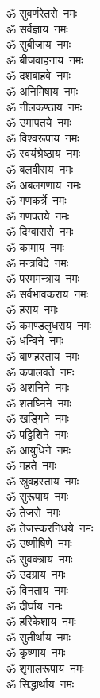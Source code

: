 \begin{multicols}{2}
\begin{flushleft}
ॐ सुवर्णरेतसे~नमः\\
ॐ सर्वज्ञाय~नमः\\
ॐ सुबीजाय~नमः\\
ॐ बीजवाहनाय~नमः\hfill{}\\
ॐ दशबाहवे~नमः\\
ॐ अनिमिषाय~नमः\\
ॐ नीलकण्ठाय~नमः\\
ॐ उमापतये~नमः\\
ॐ विश्वरूपाय~नमः\\
ॐ स्वयंश्रेष्ठाय~नमः\\
ॐ बलवीराय~नमः\\
ॐ अबलगणाय~नमः\\
ॐ गणकर्त्रे~नमः\\
ॐ गणपतये~नमः\hfill{}\\
ॐ दिग्वाससे~नमः\\
ॐ कामाय~नमः\\
ॐ मन्त्रविदे~नमः\\
ॐ परममन्त्राय~नमः\\
ॐ सर्वभावकराय~नमः\\
ॐ हराय~नमः\\
ॐ कमण्डलुधराय~नमः\\
ॐ धन्विने~नमः\\
ॐ बाणहस्ताय~नमः\\
ॐ कपालवते~नमः\hfill{}\\
ॐ अशनिने~नमः\\
ॐ शतघ्निने~नमः\\
ॐ खड्गिने~नमः\\
ॐ पट्टिशिने~नमः\\
ॐ आयुधिने~नमः\\
ॐ महते~नमः\\
ॐ स्रुवहस्ताय~नमः\\
ॐ सुरूपाय~नमः\\
ॐ तेजसे~नमः\\
ॐ तेजस्करनिधये~नमः\hfill{}\\
ॐ उष्णीषिणे~नमः\\
ॐ सुवक्त्राय~नमः\\
ॐ उदग्राय~नमः\\
ॐ विनताय~नमः\\
ॐ दीर्घाय~नमः\\
ॐ हरिकेशाय~नमः\\
ॐ सुतीर्थाय~नमः\\
ॐ कृष्णाय~नमः\\
ॐ शृगालरूपाय~नमः\\
ॐ सिद्धार्थाय~नमः\hfill{}\\

\end{flushleft}
\end{multicols}

